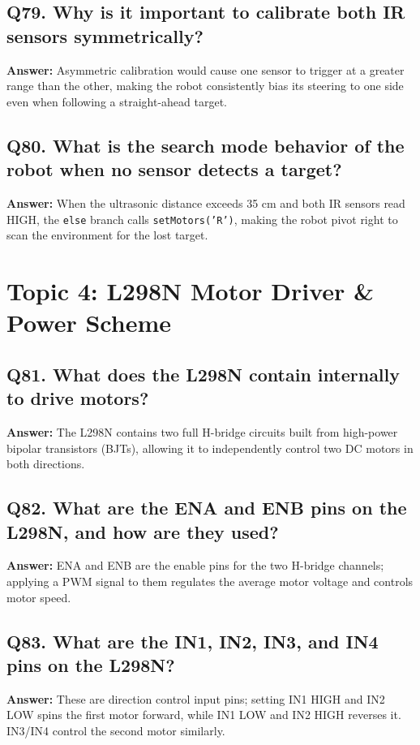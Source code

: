 \documentclass[12pt,a4paper,oneside]{report}
\begin{document}
\section{Q79. Why is it important to calibrate both IR sensors symmetrically?}
\textbf{Answer:} Asymmetric calibration would cause one sensor to trigger at a greater range than the other, making the robot consistently bias its steering to one side even when following a straight-ahead target.

\section{Q80. What is the search mode behavior of the robot when no sensor detects a target?}
\textbf{Answer:} When the ultrasonic distance exceeds 35 cm and both IR sensors read HIGH, the \texttt{else} branch calls \texttt{setMotors('R')}, making the robot pivot right to scan the environment for the lost target.

\chapter{Topic 4: L298N Motor Driver \& Power Scheme}

\section{Q81. What does the L298N contain internally to drive motors?}
\textbf{Answer:} The L298N contains two full H-bridge circuits built from high-power bipolar transistors (BJTs), allowing it to independently control two DC motors in both directions.

\section{Q82. What are the ENA and ENB pins on the L298N, and how are they used?}
\textbf{Answer:} ENA and ENB are the enable pins for the two H-bridge channels; applying a PWM signal to them regulates the average motor voltage and controls motor speed.

\section{Q83. What are the IN1, IN2, IN3, and IN4 pins on the L298N?}
\textbf{Answer:} These are direction control input pins; setting IN1 HIGH and IN2 LOW spins the first motor forward, while IN1 LOW and IN2 HIGH reverses it. IN3/IN4 control the second motor similarly.
\end{document}
